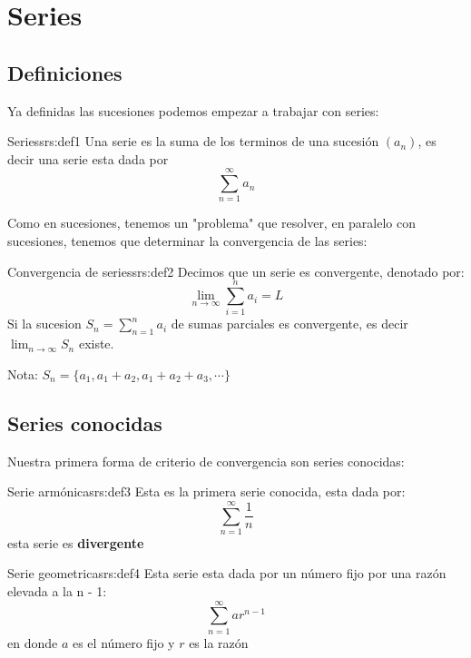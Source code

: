 \section{\Large Series}

\subsection{Definiciones}

Ya definidas las sucesiones podemos empezar a trabajar con series: 

\begin{definicion}{Series}{srs:def1}
    Una serie es la suma de los terminos de una sucesión $(a_n)$, es decir una serie esta dada por 
    \[ 
        \sum_{n = 1}^{\infty} a_n
    \]
\end{definicion}

Como en sucesiones, tenemos un "problema" que resolver, en paralelo con sucesiones, tenemos que determinar la convergencia de las series:

\begin{definicion}{Convergencia de series}{srs:def2}
    Decimos que un serie es convergente, denotado por:
    \[ 
        \lim_{n \to \infty} \sum_{i = 1}^{n} a_i = L
    \]
    Si la sucesion $S_n = \sum_{n = 1}^n a_i$ de sumas parciales es convergente, es decir $\lim_{n \to \infty} S_n$ existe. 
\end{definicion}

Nota: $S_n = \{a_1, a_1 + a_2, a_1 + a_2 + a_3, \cdots \}$

\subsection{Series conocidas}

Nuestra primera forma de criterio de convergencia son series conocidas:

\begin{definicion}{Serie armónica}{srs:def3}
    Esta es la primera serie conocida, esta dada por:
    \[ 
        \sum_{n = 1}^{\infty} \frac{1}{n} 
    \]
    esta serie es \textbf{divergente}
\end{definicion}

\begin{definicion}{Serie geometrica}{srs:def4}
    Esta serie esta dada por un número fijo por una razón elevada a la n - 1:
    \[ 
        \sum_{n = 1}^{\infty} ar^{n - 1} 
    \]
    en donde $a$ es el número fijo y $r$ es la razón
\end{definicion}

